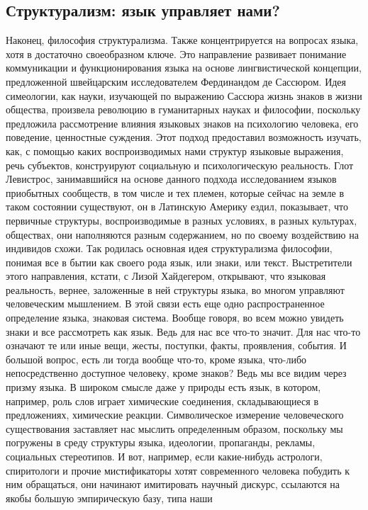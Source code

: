 \subsection{Структурализм: язык управляет нами?}
Наконец, философия структурализма. Также концентрируется на вопросах языка, хотя
в достаточно своеобразном ключе. Это направление развивает понимание
коммуникации и функционирования языка на основе лингвистической концепции,
предложенной швейцарским исследователем Фердинандом де Сассюром. Идея
симеологии, как науки, изучающей по выражению Сассюра жизнь знаков в жизни
общества, произвела революцию в гуманитарных науках и философии, поскольку
предложила рассмотрение влияния языковых знаков на психологию человека, его
поведение, ценностные суждения. Этот подход предоставил возможность изучать,
как, с помощью каких воспроизводимых нами структур языковые выражения, речь
субъектов, конструируют социальную и психологическую реальность. Глот Левистрос,
занимавшийся на основе данного подхода исследованием языков приобытных
сообществ, в том числе и тех племен, которые сейчас на земле в таком состоянии
существуют, он в Латинскую Америку ездил, показывает, что первичные структуры,
воспроизводимые в разных условиях, в разных культурах, обществах, они
наполняются разным содержанием, но по своему воздействию на индивидов схожи. Так
родилась основная идея структурализма философии, понимая все в бытии как своего
рода язык, или знаки, или текст. Выстретители этого направления, кстати, с Лизой
Хайдегером, открывают, что языковая реальность, вернее, заложенные в ней
структуры языка, во многом управляют человеческим мышлением. В этой связи есть
еще одно распространенное определение языка, знаковая система. Вообще говоря, во
всем можно увидеть знаки и все рассмотреть как язык. Ведь для нас все что-то
значит. Для нас что-то означают те или иные вещи, жесты, поступки, факты,
проявления, события. И большой вопрос, есть ли тогда вообще что-то, кроме языка,
что-либо непосредственно доступное человеку, кроме знаков? Ведь мы все видим
через призму языка. В широком смысле даже у природы есть язык, в котором,
например, роль слов играет химические соединения, складывающиеся в предложениях,
химические реакции. Символическое измерение человеческого существования
заставляет нас мыслить определенным образом, поскольку мы погружены в среду
структуры языка, идеологии, пропаганды, рекламы, социальных стереотипов. И вот,
например, если какие-нибудь астрологи, спиритологи и прочие мистификаторы хотят
современного человека побудить к ним обращаться, они начинают имитировать
научный дискурс, ссылаются на якобы большую эмпирическую базу, типа наши
